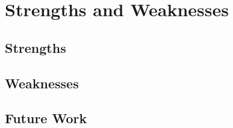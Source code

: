 \section{Strengths and Weaknesses}

\subsection{Strengths}
\subsection{Weaknesses}
\subsection{Future Work}

